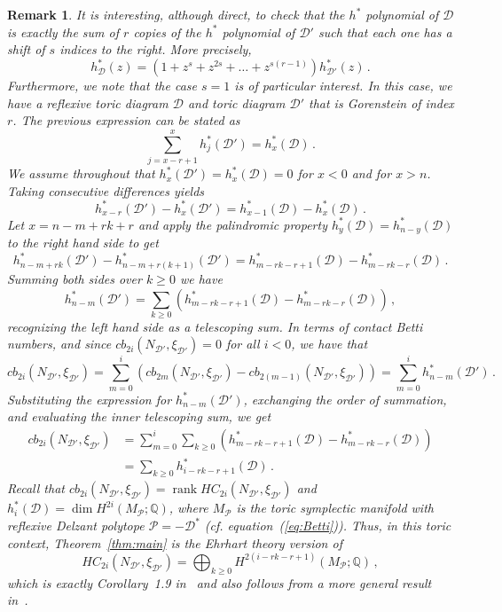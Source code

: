 \documentclass[a4paper,11pt,reqno]{amsart}
\newcommand{\Dd}{{\mathcal D}}
\newcommand{\Pp}{{\mathcal P}}
\DeclareMathOperator{\rank}{rank}
\newtheorem{remark}[theorem]{Remark}
\begin{document}
\begin{remark} \label{rem:main}
It is interesting, although direct, to check that the $h^*$ polynomial of $\mathcal{D}$ is exactly the sum of $r$ copies of the $h^*$ polynomial of $\mathcal{D}'$ such that each one has a shift of $s$ indices to the right. 
More precisely,
\[
h^*_{\mathcal{D}}(z)=\left(1+z^s+z^{2s}+\dots+z^{s(r-1)}\right)h^*_{\mathcal{D}'}(z)\,.
\]
Furthermore, we note that the case $s=1$ is of particular interest. In this case, we have a reflexive toric diagram $\mathcal{D}$ 
and toric diagram $\mathcal{D}'$ that is Gorenstein of index $r$. The previous expression can be stated as
\[
\sum_{j=x-r+1}^{x} h_j^*(\mathcal{D}')= h_x^*(\mathcal{D})\,.
\]
We assume throughout that $h_x^*(\mathcal{D}')= h_x^*(\mathcal{D})=0$ for $x<0$ and for $x>n$. Taking consecutive differences 
yields
\[
h_{x-r}^*(\mathcal{D}') - h_x^*(\mathcal{D}') = h_{x-1}^*(\mathcal{D}) - h_x^*(\mathcal{D})\,.
\]
Let $x = n-m+rk+r$ and apply the palindromic property $h_y^*(\mathcal{D}) = h_{n-y}^*(\mathcal{D})$ to the right hand side to get
\[
h_{n-m+rk}^*(\mathcal{D}') - h_{n-m+r(k+1)}^*(\mathcal{D}') = h_{m-rk-r+1}^*(\mathcal{D}) - h_{m-rk-r}^*(\mathcal{D})\,.
\]
Summing both sides over $k \ge 0$ we have
\[
h_{n-m}^*(\mathcal{D}') = \sum_{k \ge 0} \left( h_{m-rk-r+1}^*(\mathcal{D}) - h_{m-rk-r}^*(\mathcal{D}) \right)\,,
\]
recognizing the left hand side as a telescoping sum. In terms of contact Betti numbers, and
since $cb_{2i}(N_{\mathcal{D}'}, \xi_{\mathcal{D}'})=0$ for all $i<0$, we have that
\[
cb_{2i}(N_{\mathcal{D}'}, \xi_{\mathcal{D}'}) = \sum_{m=0}^i (cb_{2m}(N_{\mathcal{D}'}, \xi_{\mathcal{D}'}) - 
cb_{2(m-1)}(N_{\mathcal{D}'}, \xi_{\mathcal{D}'})) = \sum_{m=0}^i h_{n-m}^*(\mathcal{D}')\,.
\]
Substituting the expression for $h_{n-m}^*(\mathcal{D}')$, exchanging the order of summation, and evaluating the inner 
telescoping sum, we get
\begin{align*}
cb_{2i}(N_{\mathcal{D}'}, \xi_{\mathcal{D}'}) &= \sum_{m=0}^i \sum_{k \ge 0} 
\left( h_{m-rk-r+1}^*(\mathcal{D}) - h_{m-rk-r}^*(\mathcal{D}) \right) \\
&= \sum_{k \ge 0} h_{i-rk-r+1}^*(\mathcal{D})\,.
\end{align*}
Recall that $cb_{2i}(N_{\mathcal{D}'}, \xi_{\mathcal{D}'})=\rank HC_{2i}(N_{\mathcal{D}'}, \xi_{\mathcal{D}'})$ 
and $h_{i}^*(\mathcal{D})=\dim H^{2i}(M_\Pp; \mathbb{Q})$, where $M_\Pp$ is the toric symplectic manifold with 
reflexive Delzant polytope $\Pp = - \Dd^\ast$ (cf. equation~(\ref{eq:Betti})). Thus, in this toric context, 
Theorem~\ref{thm:main} is the Ehrhart theory version of 
\[
HC_{2i}(N_{\mathcal{D}'}, \xi_{\mathcal{D}'} )= \bigoplus_{k \geq 0} H^{2(i-rk-r+1)}(M_\mathcal{P}; \mathbb{Q})\,,
\]
which is exactly Corollary~1.9 in~\cite{AMM} and also follows from a more general result in~\cite{B}.
\end{remark}
\end{document}
